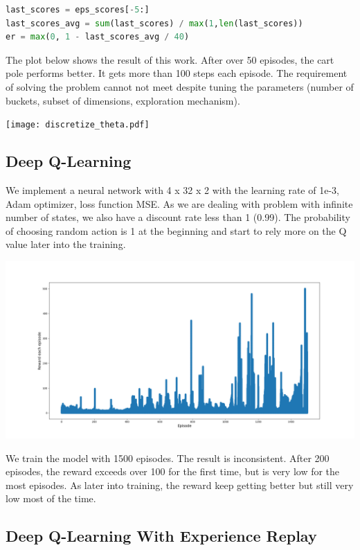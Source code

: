 \documentclass[11pt]{article}
\begin{document}
\begin{lstlisting}[language=python, caption=distance functions]
last_scores = eps_scores[-5:]
last_scores_avg = sum(last_scores) / max(1,len(last_scores))
er = max(0, 1 - last_scores_avg / 40)
\end{lstlisting}

The plot below shows the result of this work. After over 50 episodes, the cart pole performs better. It gets more than 100 steps each episode. The requirement of solving the problem cannot not meet despite tuning the parameters (number of buckets, subset of dimensions, exploration mechanism).

\texttt{[image: discretize\_theta.pdf]}

\subsection{Deep Q-Learning}

We implement a neural network with 4 x 32 x 2 with the learning rate of 1e-3, Adam optimizer, loss function MSE. As we are dealing with problem with infinite number of states, we also have a discount rate less than 1 (0.99). The probability of choosing random action is 1 at the beginning and start to rely more on the Q value later into the training.

\includegraphics[width=\textwidth,height=\textheight,keepaspectratio]{figures/dqn.png}

We train the model with 1500 episodes. The result is inconsistent. After 200 episodes, the reward exceeds over 100 for the first time, but is very low for the most episodes. As later into training, the reward keep getting better but still very low most of the time.

\subsection{Deep Q-Learning With Experience Replay}
\end{document}
